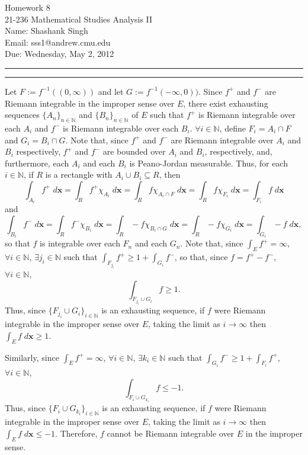 \documentclass[11pt]{article}
\makeatletter
\newcounter{questionCounter}
\newcounter{partCounter}[questionCounter]
\newenvironment{question}[2][\arabic{questionCounter}]{%
    \setcounter{partCounter}{0}%
    \vspace{.25in} \hrule \vspace{0.5em}%
        \noindent{\bf #2}%
    \vspace{0.8em} \hrule \vspace{.10in}%
    \addtocounter{questionCounter}{1}%
}{}
\newcommand{\myname}{Shashank Singh}
\newcommand{\myandrew}{sss1@andrew.cmu.edu}
\newcommand{\myclass}{21-236 Mathematical Studies Analysis II}
\newcommand{\myhwnum}{8}
\newcommand{\duedate}{Wednesday, May 2, 2012}
\newcommand{\bx}{\mathbf{x}}
\makeatother
\begin{document}
\thispagestyle{plain}

{\Large Homework \myhwnum} \\
\myclass \\
Name: \myname \\
Email: \myandrew \\
Due: \duedate \\

\begin{question}{Problem 1}
Let $F := f^{-1}((0,\infty))$ and let $G := f^{-1}(-\infty,0))$.
Since $f^+$ and $f^-$ are Riemann integrable in the improper sense over $E$,
there exist exhausting sequences $\{A_n\}_{n \in \mathbb{N}}$ and
$\{B_n\}_{n \in \mathbb{N}}$ of $E$ such that $f^+$ is Riemann integrable over
each $A_i$ and $f^-$ is Riemann integrable over each $B_i$.
$\forall i \in \mathbb{N}$, define $F_i = A_i \cap F$ and $G_i = B_i \cap G$.
Note that, since $f^+$ and $f^-$ are Riemann integrable over $A_i$ and $B_i$
respectively, $f^+$ and $f^-$ are bounded over $A_i$ and $B_i$, respectively,
and, furthermore, each $A_i$ and each $B_i$ is Peano-Jordan measurable. Thus,
for each $i \in \mathbb{N}$, if $R$ is a rectangle with
$A_i \cup B_i \subseteq R$, then
\[\int_{A_i} f^+ \; d\bx
 = \int_R f^+\chi_{A_i} \; d\bx
 = \int_R f\chi_{A_i \cap F} \; d\bx
 = \int_R f\chi_{F_i} \; d\bx
 = \int_{F_i} f \; d\bx
\]
and
\[\int_{B_i} f^- \; d\bx
 = \int_R f^-\chi_{B_i} \; d\bx
 = \int_R -f\chi_{B_i \cap G} \; d\bx
 = \int_R -f\chi_{G_i} \; d\bx
 = \int_{G_i} -f \; d\bx
,\]
so that $f$ is integrable over each $F_n$ and each $G_n$.
Note that, since $\int_E f^+ = \infty$, $\forall i \in \mathbb{N}$,
$\exists j_i \in \mathbb{N}$ such that
$\int_{F_{j_i}} f^+ \geq 1 + \int_{G_i} f^-$, so that, since $f = f^+ - f^-$,
$\forall i \in \mathbb{N}$, 
\[\int_{F_{j_i} \cup G_i} f \geq 1.\]
Thus, since $\{F_{j_i} \cup G_i\}_{i \in \mathbb{N}}$ is an exhausting
sequence, if $f$ were Riemann integrable in the improper sense over $E$,
taking the limit as $i \rightarrow \infty$ then $\int_E f \; d\bx \geq 1$.

Similarly, since $\int_E f^+ = \infty$, $\forall i \in \mathbb{N}$,
$\exists k_i \in \mathbb{N}$ such that
$\int_{G_i} f^- \geq 1 + \int_{F_i} f^+$,
$\forall i \in \mathbb{N}$, 
\[\int_{F_i \cup G_{k_i}} f \leq -1.\]
Thus, since $\{F_i \cup G_{k_i}\}_{i \in \mathbb{N}}$ is an exhausting
sequence, if $f$ were Riemann integrable in the improper sense over $E$,
taking the limit as $i \rightarrow \infty$ then $\int_E f \; d\bx \leq -1$.
Therefore, $f$ cannot be Riemann integrable over $E$ in the improper sense.
\end{question}
\end{document}
